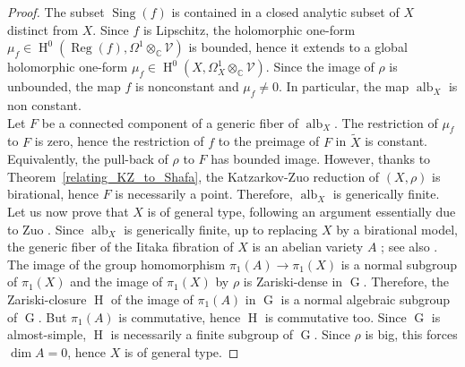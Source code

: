 \documentclass[11pt,letterpaper]{amsart}
\def\bC{\mathbb{C}}
\def\cV{\mathcal{V}}
\theoremstyle{plain}
\DeclareMathOperator{\rG}{G}
\DeclareMathOperator{\rH}{H}
\DeclareMathOperator{\alb}{alb}
\DeclareMathOperator{\HH}{H}
\DeclareMathOperator{\Sing}{Sing}
\DeclareMathOperator{\Reg}{Reg}
\begin{document}
\begin{proof}
The subset $\Sing(f)$ is contained in a closed analytic subset of $X$ \cite[Proposition 1.3.3]{Eyssidieux-reductive} distinct from $X$. Since $f$ is Lipschitz, the holomorphic one-form $\mu_f \in \HH^0(\Reg(f) , \Omega^1 \otimes_\bC \cV)$ is bounded, hence it extends to a global holomorphic one-form $\mu_f \in \HH^0(X, \Omega^1_X \otimes_\bC \cV)$. Since the image of $\rho$ is unbounded, the map $f$ is nonconstant and $\mu_f \neq 0$. In particular, the map  $\alb_X$ is non constant. \\
Let $F$ be a connected component of a generic fiber of $\alb_X$. The restriction of $\mu_f$ to $F$ is zero, hence the restriction of $f$ to the preimage of $F$ in $\tilde X$ is constant. Equivalently, the pull-back of $\rho$ to $F$ has bounded image. However, thanks to Theorem~\ref{relating_KZ_to_Shafa}, the Katzarkov-Zuo reduction of $(X, \rho)$ is birational, hence $F$ is necessarily a point. Therefore, $\alb_X$ is generically finite.\\

Let us now prove that $X$ is of general type, following an argument essentially due to Zuo \cite{Zuo-Chern-hyperbolicity}. Since $\alb_X$ is generically finite, up to replacing $X$ by a birational model, the generic fiber of the Iitaka fibration of $X$ is an abelian variety $A$ \cite[Proposition 17.5.1]{Kollar-Shafa-book}; see also \cite[Theorem 13]{Kawamata-characterization}.
The image of the group homomorphism $\pi_1(A) \to \pi_1(X)$ is a normal subgroup of $\pi_1(X)$ and the image of $\pi_1(X)$ by $\rho$ is Zariski-dense in $\rG$. Therefore, the Zariski-closure $\rH$ of the image of $\pi_1(A)$ in $\rG$ is a normal algebraic subgroup of $\rG$. But $\pi_1(A)$ is commutative, hence $\rH$ is commutative too. Since $\rG$ is almost-simple, $\rH$ is necessarily a finite subgroup of $\rG$. Since $\rho$ is big, this forces $\dim A = 0$, hence $X$ is of general type.
\end{proof}
\end{document}
